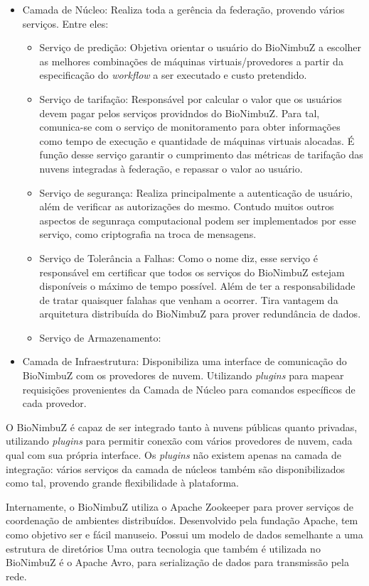 \begin{itemize}
	\item Camada de Núcleo: Realiza toda a gerência da federação, provendo vários serviços. Entre eles:
	\begin{itemize}
		\item Serviço de predição: Objetiva orientar o usuário do BioNimbuZ a escolher as melhores combinações de máquinas virtuais/provedores a partir da especificação do \textit{workflow} a ser executado e custo pretendido.
		\item Serviço de tarifação: Responsável por calcular o valor que os usuários devem pagar pelos serviços providndos do BioNimbuZ. Para tal, comunica-se com o serviço de monitoramento para obter informações como tempo de execução e quantidade de máquinas virtuais alocadas. É função desse serviço garantir o cumprimento das métricas de tarifação das nuvens integradas à federação, e repassar o valor ao usuário.
		\item Serviço de segurança: Realiza principalmente a autenticação de usuário, além de verificar as autorizações do mesmo. Contudo muitos outros aspectos de segunraça computacional podem ser implementados por esse serviço, como criptografia na troca de mensagens.
		\item Serviço de Tolerância a Falhas: Como o nome diz, esse serviço é responsável em certificar que todos os serviços do BioNimbuZ estejam disponíveis o máximo de tempo possível. Além de ter a responsabilidade de tratar quaisquer falahas que venham a ocorrer. Tira vantagem da arquitetura distribuída do BioNimbuZ para prover redundância de dados.
		\item Serviço de Armazenamento: 
	\end{itemize}
	
	\item Camada de Infraestrutura: Disponibiliza uma interface de comunicação do BioNimbuZ com os provedores de nuvem. Utilizando \textit{plugins} para mapear requisições provenientes da Camada de Núcleo para comandos específicos de cada provedor.
\end{itemize}

O BioNimbuZ é capaz de ser integrado tanto à nuvens públicas quanto privadas, utilizando \textit{plugins} para permitir conexão com vários provedores de nuvem, cada qual com sua própria interface. Os \textit{plugins} não existem apenas na camada de integração: vários serviços da camada de núcleos também são disponibilizados como tal, provendo grande flexibilidade à plataforma.

Internamente, o BioNimbuZ utiliza o Apache Zookeeper\cite{Zookeeper} para prover serviços de coordenação de ambientes distribuídos. Desenvolvido pela fundação Apache\cite{Apache}, tem como objetivo ser e fácil manuseio. Possui um modelo de dados semelhante a uma estrutura de diretórios
Uma outra tecnologia que também é utilizada no BioNimbuZ é o Apache Avro\cite{Avro}, para serialização de dados para transmissão pela rede.
